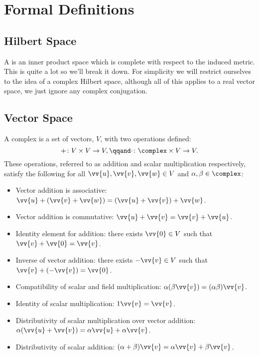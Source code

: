\chapter{Formal Definitions}
    \section{Hilbert Space}
    A  is an inner product space which is complete with respect to the induced metric.
    This is quite a lot so we'll break it down.
    For simplicity we will restrict ourselves to the idea of a complex Hilbert space, although all of this applies to a real vector space, we just ignore any complex conjugation.
    
    \section{Vector Space}
    A complex  is a set of vectors, \(V\), with two operations defined:
    \begin{equation}
        +\colon V\times V \to V, \qqand \cdot\colon \complex\times V \to V.
    \end{equation}
    These operations, referred to as addition and scalar multiplication respectively, satisfy the following for all \(\vv{u}, \vv{v}, \vv{w}\in V\) and \(\alpha, \beta\in\complex\):
    \begin{itemize}
        \item Vector addition is associative: \(\vv{u} + (\vv{v} + \vv{w}) = (\vv{u} + \vv{v}) + \vv{w}\).
        \item Vector addition is commutative: \(\vv{u} + \vv{v} = \vv{v} + \vv{u}\).
        \item Identity element for addition: there exists \(\vv{0} \in V\) such that \(\vv{v} + \vv{0} = \vv{v}\).
        \item Inverse of vector addition: there exists \(-\vv{v}\in V\) such that \(\vv{v} + (-\vv{v}) = \vv{0}\).
        \item Compatibility of scalar and field multiplication: \(\alpha(\beta\vv{v}) = (\alpha\beta)\vv{v}\).
        \item Identity of scalar multiplication: \(1\vv{v} = \vv{v}\).
        \item Distributivity of scalar multiplication over vector addition: \(\alpha(\vv{u} + \vv{v}) = \alpha\vv{u} + \alpha\vv{v}\).
        \item Distributivity of scalar addition: \((\alpha + \beta)\vv{v} = \alpha\vv{v} + \beta\vv{v}\).
    \end{itemize}

